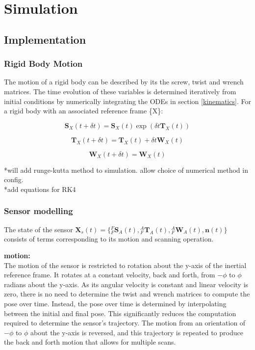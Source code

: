 \chapter{Simulation}
\section{Implementation}
\subsection{Rigid Body Motion}
The motion of a rigid body can be described by its the screw, twist and wrench matrices. The time evolution of these variables is determined iteratively from initial conditions by numerically integrating the ODEs in section \ref{kinematics}. For a rigid body with an associated reference frame \{X\}:

\begin{equation}
	\mathbf{S}_X(t+\delta t) = \mathbf{S}_X(t)\exp({\delta t {\mathbf{T}_X(t)}})
\end{equation}

\begin{equation}
	\mathbf{T}_X(t+\delta t) = \mathbf{T}_X(t) + \delta t \mathbf{W}_X(t)
\end{equation}

\begin{equation}
	\mathbf{W}_X(t+\delta t) =\mathbf{W}_X(t)
\end{equation}

*will add runge-kutta method to simulation. allow choice of numerical method in config.\\
*add equations for RK4 

\subsection{Sensor modelling}
The state of the sensor 
$\mathbf{X}_{s}(t) = 
	\{{^{F}_{F}\mathbf{S}^{}_{A}(t)},{^{A}_{F}\mathbf{T}^{}_{A}(t)},{^{A}_{F}\mathbf{W}^{}_{A}(t)},
	\mathbf{n}(t)\}$
consists of terms corresponding to its motion and scanning operation. 

\textbf{motion:}\\
The motion of the sensor is restricted to rotation about the y-axis of the inertial reference frame. It rotates at a constant velocity, back and forth, from $-\phi$ to $\phi$ radians about the y-axis.  As its angular velocity is constant and linear velocity is zero, there is no need to determine the twist and wrench matrices to compute the pose over time. Instead, the pose over time is determined by interpolating between the initial and final pose. This significantly reduces the computation required to determine the sensor's trajectory. The motion from an orientation of $-\phi$ to $\phi$ about the y-axis is reversed, and this trajectory is repeated to produce the back and forth motion that allows for multiple scans.

